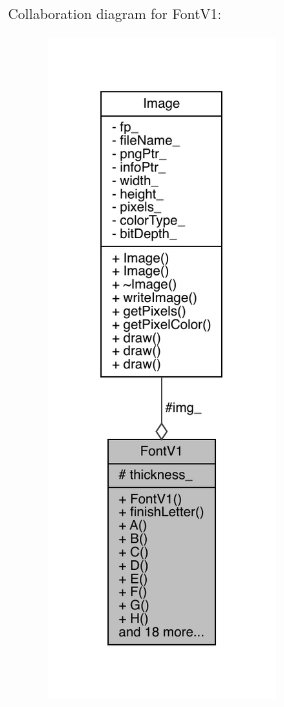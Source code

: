 Collaboration diagram for Font\+V1\+:
\nopagebreak
\begin{figure}[H]
\begin{center}
\leavevmode
\includegraphics[width=171pt]{class_font_v1__coll__graph}
\end{center}
\end{figure}
